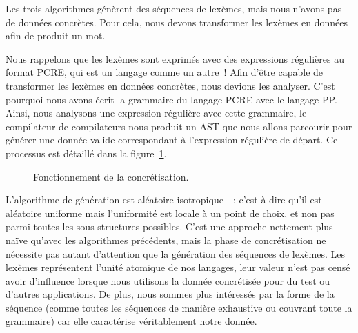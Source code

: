 Les trois algorithmes génèrent des séquences de lexèmes, mais nous n'avons pas
de données concrètes. Pour cela, nous devons transformer les lexèmes en données
afin de produit un mot.

Nous rappelons que les lexèmes sont exprimés avec des expressions régulières au
format PCRE, qui est un langage comme un autre~! Afin d'être capable de
transformer les lexèmes en données concrètes, nous devions les analyser. C'est
pourquoi nous avons écrit la grammaire du langage PCRE avec le langage PP.
Ainsi, nous analysons une expression régulière avec cette grammaire, le
compilateur de compilateurs nous produit un AST que nous allons parcourir pour
générer une donnée valide correspondant à l'expression régulière de départ. Ce
processus est détaillé dans la figure~\ref{figure:data:regex}.
%
\begin{figure}


\caption{\label{figure:data:regex} Fonctionnement de la concrétisation.}

\end{figure}
%
L'algorithme de génération est aléatoire isotropique~~: c'est à
dire qu'il est aléatoire uniforme mais l'uniformité est locale à un point de
choix, et non pas parmi toutes les sous-structures possibles. C'est une approche
nettement plus naïve qu'avec les algorithmes précédents, mais la phase de
concrétisation ne nécessite pas autant d'attention que la génération des
séquences de lexèmes. Les lexèmes représentent l'unité atomique de nos langages,
leur valeur n'est pas censé avoir d'influence lorsque nous utilisons la donnée
concrétisée pour du test ou d'autres applications. De plus, nous sommes plus
intéressés par la forme de la séquence (comme toutes les séquences de manière
exhaustive ou couvrant toute la grammaire) car elle caractérise véritablement
notre donnée.

